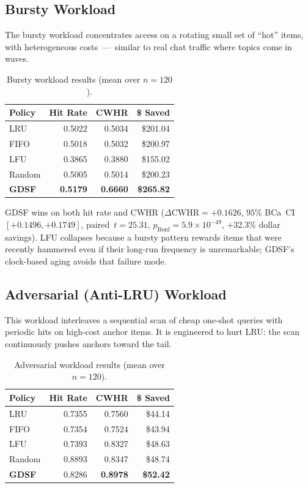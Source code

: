 \documentclass[sigconf, nonacm, review=false, screen=true]{acmart}
\begin{document}
\subsection{Bursty Workload}
The bursty workload concentrates access on a rotating small set of ``hot''
items, with heterogeneous costs~---~similar to real chat traffic where
topics come in waves.

\begin{table}[t]
  \centering
  \caption{Bursty workload results (mean over $n=120$).}
  \label{tab:bursty}
  \begin{tabular}{lrrr}
    \toprule
    Policy & Hit Rate & CWHR & \$ Saved \\
    \midrule
    LRU     & 0.5022 & 0.5034 & \$201.04 \\
    FIFO    & 0.5018 & 0.5032 & \$200.97 \\
    LFU     & 0.3865 & 0.3880 & \$155.02 \\
    Random  & 0.5005 & 0.5014 & \$200.23 \\
    \textbf{GDSF} & \textbf{0.5179} & \textbf{0.6660} & \textbf{\$265.82} \\
    \bottomrule
  \end{tabular}
\end{table}

GDSF wins on both hit rate and CWHR ($\Delta\text{CWHR} = +0.1626$,
$95\%$ BCa~CI $[+0.1496, +0.1749]$, paired~$t = 25.31$,
$p_{\text{Bonf}} = 5.9\!\times\!10^{-49}$, $+32.3\%$ dollar savings). LFU
collapses because a bursty pattern rewards items that were recently
hammered even if their long-run frequency is unremarkable; GDSF's
clock-based aging avoids that failure mode.

\subsection{Adversarial (Anti-LRU) Workload}
This workload interleaves a sequential scan of cheap one-shot queries
with periodic hits on high-cost anchor items. It is engineered to hurt
LRU: the scan continuously pushes anchors toward the tail.

\begin{table}[t]
  \centering
  \caption{Adversarial workload results (mean over $n=120$).}
  \label{tab:adversarial}
  \begin{tabular}{lrrr}
    \toprule
    Policy & Hit Rate & CWHR & \$ Saved \\
    \midrule
    LRU     & 0.7355 & 0.7560 & \$44.14 \\
    FIFO    & 0.7354 & 0.7524 & \$43.94 \\
    LFU     & 0.7393 & 0.8327 & \$48.63 \\
    Random  & 0.8893 & 0.8347 & \$48.74 \\
    \textbf{GDSF} & 0.8286 & \textbf{0.8978} & \textbf{\$52.42} \\
    \bottomrule
  \end{tabular}
\end{table}
\end{document}

